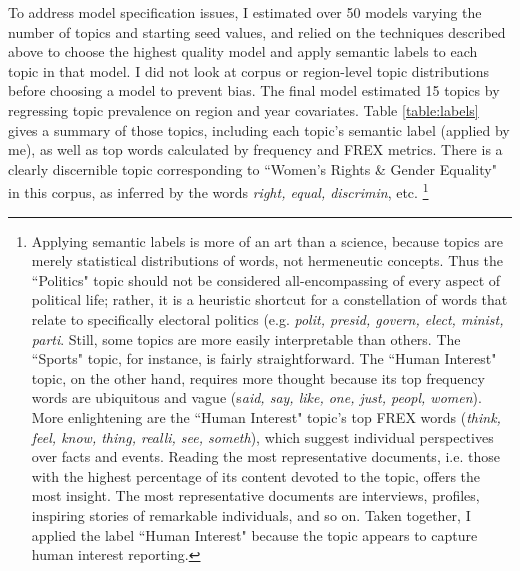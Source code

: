 \documentclass[11pt, oneside]{article}
\begin{document}
To address model specification issues, I estimated over 50 models varying the number of topics and starting seed values, and relied on the techniques described above to choose the highest quality model and apply semantic labels to each topic in that model. I did not look at corpus or region-level topic distributions before choosing a model to prevent bias. The final model estimated 15 topics by regressing topic prevalence on region and year covariates. Table \ref{table:labels} gives a summary of those topics, including each topic's semantic label (applied by me), as well as top words calculated by frequency and FREX metrics. There is a clearly discernible topic corresponding to ``Women's Rights \& Gender Equality" in this corpus, as inferred by the words \emph{right, equal, discrimin}, etc. \footnote{\hspace{5} Applying semantic labels is more of an art than a science, because topics are merely statistical distributions of words, not hermeneutic concepts. Thus the ``Politics" topic should not be considered all-encompassing of every aspect of political life; rather, it is a heuristic shortcut for a constellation of words that relate to specifically electoral politics (e.g. \emph{polit, presid, govern, elect, minist, parti}. Still, some topics are more easily interpretable than others. The ``Sports" topic, for instance, is fairly straightforward. The ``Human Interest" topic, on the other hand, requires more thought because its top frequency words are ubiquitous and vague (s\emph{aid, say, like, one, just, peopl, women}). More enlightening are the ``Human Interest" topic's top FREX words (\emph{think, feel, know, thing, realli, see, someth}), which suggest individual perspectives over facts and events. Reading the most representative documents, i.e. those with the highest percentage of its content devoted to the topic, offers the most insight. The most representative documents are interviews, profiles, inspiring stories of remarkable individuals, and so on. Taken together, I applied the label ``Human Interest" because the topic appears to capture human interest reporting.}
\end{document}
